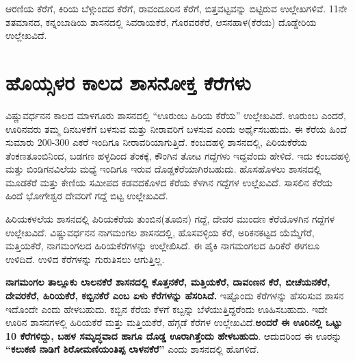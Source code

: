 ಆರಣಿಯ ಕೆರೆಗೆ, ಕಿರಿಯ ಬೆಳ್ಗುಂದದ ಕೆರೆಗೆ, ರಾವಂದೂರಿನ ಕೆರೆಗೆ, ಬಿತ್ತವಟ್ಟವನ್ನು ಬಿಟ್ಟಿರುವ ಉಲ್ಲೇಖಗಳಿವೆ. 11ನೇ ಶತಮಾನದ, ಕನ್ನಂಬಾಡಿಯ ಶಾಸನದಲ್ಲಿ ಸಿವರಾಯಕೆರೆ, ಗೊರವರಕೆರೆ, ಆಸನಹಾಳ(ಕೆರೆಯ) ದೊಡ್ಡೇರಿಯ ಉಲ್ಲೇಖವಿದೆ.

\section*{ಹೊಯ್ಸಳರ ಕಾಲದ ಶಾಸನೋಕ್ತ ಕೆರೆಗಳು}

ವಿಷ್ಣುವರ್ಧನನ ಕಾಲದ ಮಾಳಗೂರು ಶಾಸನದಲ್ಲಿ “ಊರುಂಬ ಹಿರಿಯ ಕೆರೆಯ” ಉಲ್ಲೇಖವಿದೆ. ಊರುಂಬ ಎಂದರೆ, ಊರಿನವರು ತಮ್ಮ ದಿನಬಳಕೆಗೆ ಬಳಸುವ ಮತ್ತು ನೀರಾವರಿಗೆ ಬಳಸುವ ಎಂದು ಅರ್ಥೈಸಬಹುದು. ಈ ಕೆರೆಯ ಹಿಂದೆ ಸುಮಾರು 200-300 ಎಕರೆ ಇಂದಿಗೂ ನೀರಾವರಿಯಾಗುತ್ತಿದೆ. ಕಂಬದಹಳ್ಳಿ ಶಾಸನದಲ್ಲಿ, ಪಿರಿಯಕೆರೆಯ ತೆಂಕಣತೂಂಬಿನಿಂದ, ಬಡಗಣ ಹಳ್ಳದಿಂದ ತೆಂಕಕ್ಕೆ, ಕೌಂಗಿನ ತೋಟ ಗದ್ದೆಗಳು ಇದ್ದವೆಂದು ಹೇಳಿದೆ. ಇದು ಕಂಬದಹಳ್ಳಿ ಮತ್ತು ಬಿಂಡಿಗನವಿಲೆಯ ಮಧ್ಯೆ ಇಂದಿಗೂ ಇರುವ ದೊಡ್ಡಕೆರೆಯಾಗಿರಬಹುದು. ಹೊಸಹೊಳಲು ಶಾಸನದಲ್ಲಿ ಮೂಡಕೆರೆ ಮತ್ತು ಕೇಣಿಯ ಸಮೀಪದ ಕಡವದಕೊಳದ ಕೆರೆಯ ಕೆಳಗಿನ ಗದ್ದೆಗಳ ಉಲ್ಲೆಖವಿದೆ. ಸಾಸಲಿನ ಕೆರೆಯ ಹಿಂದೆ ಭೋಗೇಶ್ವರ ದೇವರಿಗೆ ಗದ್ದೆ ಬಿಟ್ಟ ಉಲ್ಲೇಖವಿದೆ.

ಹಿರಿಯಕಳಲೆಯ ಶಾಸನದಲ್ಲಿ ಪಿರಿಯಕೆರೆಯ ತುಂಬಿನ(ತೂಬಿನ) ಗದ್ದೆ, ದೇವರ ಮುಂದಣ ಕೆರೆಯೊಳಗಿನ ಗದ್ದೆಗಳ ಉಲ್ಲೇಖವಿದೆ. ವಿಷ್ಣುವರ್ಧನನ ನಾಗಮಂಗಲ ಶಾಸನದಲ್ಲಿ, ಹೊಸವಳ್ಳಿಯ ಕೆರೆ, ಅರಿಕನಕಟ್ಟದ ಯೆಮ್ಮೆಗೆರೆ, ಮತ್ತಿಯಕೆರೆ, ನಾಗಮಂಗಲದ ಹಿರಿಯಕೆರೆಗಳನ್ನು ಉಲ್ಲೇಖಿಸಿದೆ. ಈ ಪೈಕಿ ನಾಗಮಂಗಲದ ಹಿರಿಕೆರೆ ಈಗಲೂ ಉಳಿದಿದೆ. ಉಳಿದ ಕೆರೆಗಳನ್ನು ಗುರುತಿಸಲು ಆಗುತ್ತಿಲ್ಲ.

\textbf{ನಾಗಮಂಗಲ ತಾಲ್ಲೂಕು ಲಾಲನಕೆರೆ ಶಾಸನದಲ್ಲಿ ಕೊತ್ತನಕೆರೆ, ಮತ್ತಿಯಕೆರೆ, ದಾವಂಣನ ಕೆರೆ, ಬೀಚೆಯನಕೆರೆ, ದೇವರಕೆರೆ, ಹಿರಿಯಕೆರೆ, ಕಬ್ಬಿನಕೆರೆ ಎಂಬ ಏಳು ಕೆರೆಗಳನ್ನು ಹೆಸರಿಸಿದೆ.} ಇಷ್ಟೊಂದು ಕೆರೆಗಳನ್ನು ಹೆಸರಿಸುವ ಶಾಸನ ಇದೊಂದೇ ಎಂದು ಹೇಳಬಹುದು. ಕಬ್ಬಿನ ಕೆರೆಯ ಕೆಳಗೆ ಕಬ್ಬನ್ನು ಬೆಳೆಯುತ್ತಿದ್ದರೆಂದು ಊಹಿಸಬಹುದು. ಇದೇ ಊರಿನ ಶಾಸನಗಳಲ್ಲಿ ಹಿರಿಯಕೆರೆ ಮತ್ತು ಮತ್ತಿಯಕೆರೆ, ಹೆಗ್ಗಡೆ ಕೆರೆಗಳ ಉಲ್ಲೇಖವಿದೆ.\textbf{ಅಂದರೆ ಈ ಊರಿನಲ್ಲಿ ಒಟ್ಟು 10 ಕೆರೆಗಳಿದ್ದು, ಬಹಳ ಸಮೃದ್ಧವಾದ ಹಾಗೂ ದೊಡ್ಡ ಊರಾಗಿತ್ತೆಂದು ಹೇಳಬಹುದು}. ಆದುದರಿಂದ ಈ ಊರನ್ನು \textbf{“ಕಲುಕಣಿ ನಾಡಿಗೆ ಶಿರೋಮಣಿಯಂತಿಪ್ಪ ಲಾಳನಕೆರೆ”} ಎಂದು ಶಾಸನದಲ್ಲಿ ಹೊಗಳಿದೆ.

